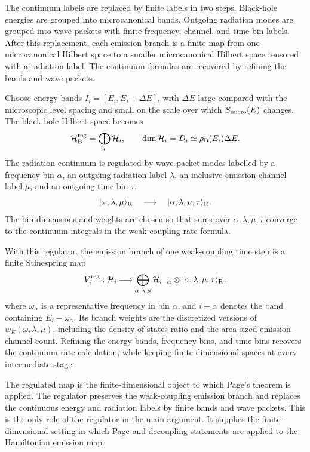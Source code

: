 \documentclass[12pt]{article}
\newcommand{\HB}{\mathcal H_{\rm B}}
\newcommand{\Smicro}{S_{\rm micro}}
\newcommand{\rhoB}{\rho_{\rm B}}
\newcommand{\ket}[1]{|#1\rangle}
\begin{document}
The continuum labels are replaced by finite labels in two steps.  Black-hole
energies are grouped into microcanonical bands.  Outgoing radiation modes are
grouped into wave packets with finite frequency, channel, and time-bin labels.
After this replacement, each emission branch is a finite map from one
microcanonical Hilbert space to a smaller microcanonical Hilbert space tensored
with a radiation label.  The continuum formulas are recovered by refining the
bands and wave packets.

Choose energy bands $I_i=[E_i,E_i+\Delta E]$, with $\Delta E$ large compared
with the microscopic level spacing and small on the scale over which
$\Smicro(E)$ changes.  The black-hole Hilbert space becomes
\begin{equation}
    \HB^{\rm reg}
    =
    \bigoplus_i \mathcal H_i,
    \qquad
    \dim\mathcal H_i
    =
    D_i
    \simeq \rhoB(E_i)\Delta E .
\end{equation}
The radiation continuum is regulated by wave-packet modes labelled by a
frequency bin $\alpha$, an outgoing radiation label $\lambda$, an inclusive
emission-channel label $\mu$, and an outgoing time bin $\tau$,
\begin{equation}
    \ket{\omega,\lambda,\mu}_{\rm R}
    \quad\longrightarrow\quad
    \ket{\alpha,\lambda,\mu,\tau}_{\rm R}.
\end{equation}
The bin dimensions and weights are chosen so that sums over
$\alpha,\lambda,\mu,\tau$ converge to the continuum integrals in the
weak-coupling rate formula.

With this regulator, the emission branch of one weak-coupling time step is a
finite Stinespring map
\begin{equation}
    V_i^{\rm reg}:
    \mathcal H_i
    \longrightarrow
    \bigoplus_{\alpha,\lambda,\mu}
    \mathcal H_{i-\alpha}\otimes
    \ket{\alpha,\lambda,\mu,\tau}_{\rm R},
\end{equation}
where $\omega_\alpha$ is a representative frequency in bin $\alpha$, and
$i-\alpha$ denotes the band containing $E_i-\omega_\alpha$.  Its branch
weights are the discretized versions of $w_E(\omega,\lambda,\mu)$, including
the density-of-states ratio and the area-sized emission-channel count.
Refining the energy bands, frequency bins, and time bins recovers the
continuum rate calculation, while keeping finite-dimensional spaces at every
intermediate stage.

The regulated map is the finite-dimensional object to which Page's theorem is
applied.  The regulator preserves the weak-coupling emission branch and replaces
the continuous energy and radiation labels by finite bands and wave packets.
This is the only role of the regulator in the main argument.  It supplies the
finite-dimensional setting in which Page and decoupling statements are
applied to the Hamiltonian emission map.
\end{document}
